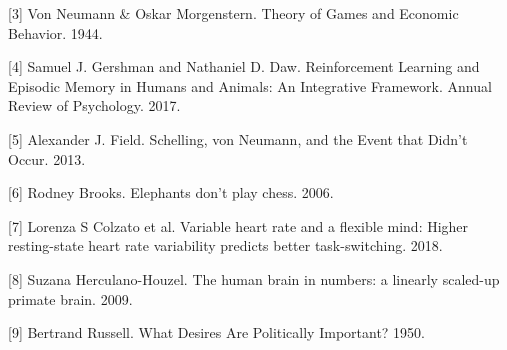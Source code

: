 \documentclass{article}
\begin{document}
[3] Von Neumann & Oskar Morgenstern. Theory of Games and Economic Behavior. 1944.

[4] Samuel J. Gershman and Nathaniel D. Daw. Reinforcement Learning and Episodic Memory in Humans and Animals: An Integrative Framework. Annual Review of Psychology. 2017.

[5] Alexander J. Field. Schelling, von Neumann, and the Event that Didn’t Occur. 2013.

[6] Rodney Brooks. Elephants don’t play chess. 2006.

[7] Lorenza S Colzato et al. Variable heart rate and a flexible mind: Higher resting-state heart rate variability predicts better task-switching. 2018.

[8] Suzana Herculano-Houzel. The human brain in numbers: a linearly scaled-up primate brain. 2009.

[9] Bertrand Russell. What Desires Are Politically Important? 1950. 
\end{document}
